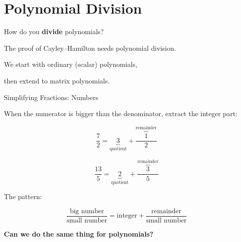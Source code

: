 \documentclass[10pt]{beamer}
\theoremstyle{definition}
\newcommand{\x}[1]{\alert{\textbf{#1}}}
\begin{document}
\section{Polynomial Division}


\begin{frame}{}
\vfill
\begin{center}
{\Large How do you \x{divide} polynomials?}
\end{center}
\vfill

The proof of Cayley--Hamilton needs polynomial division.

\vfill

We start with ordinary (scalar) polynomials,

then extend to matrix polynomials.

\vfill
\end{frame}


\begin{frame}{Simplifying Fractions: Numbers}

When the numerator is bigger than the denominator, extract the integer part:

\vfill

$$\frac{7}{2} = \underbrace{3}_{\text{quotient}} + \frac{\overbrace{1}^{\text{remainder}}}{2}$$

\vfill

$$\frac{13}{5} = \underbrace{2}_{\text{quotient}} + \frac{\overbrace{3}^{\text{remainder}}}{5}$$

\vfill

The pattern:

$$\frac{\text{big number}}{\text{small number}} = \text{integer} + \frac{\text{remainder}}{\text{small number}}$$

\vfill

\x{Can we do the same thing for polynomials?}

\vfill
\end{frame}
\end{document}
